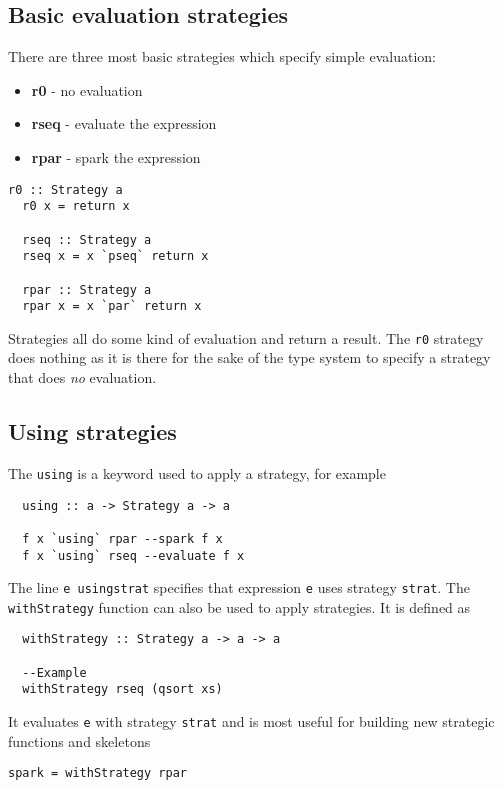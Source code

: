 \documentclass[CS4204-Notes.tex]{subfiles}
\begin{document}
\subsection{Basic evaluation strategies}
There are three most basic strategies which specify simple evaluation:
\begin{itemize}
\item \textbf{r0} - no evaluation
\item \textbf{rseq} - evaluate the expression
\item \textbf{rpar} - spark the expression
\end{itemize}
\begin{lstlisting}[caption={Definitions of basic strategies}]
  r0 :: Strategy a
  r0 x = return x

  rseq :: Strategy a
  rseq x = x `pseq` return x

  rpar :: Strategy a
  rpar x = x `par` return x
\end{lstlisting}
Strategies all do some kind of evaluation and return a result. The \texttt{r0} strategy does nothing as it is there for the sake of the type system to specify a strategy that does \textit{no} evaluation.

\subsection{Using strategies}
The \texttt{\textquoteback using\textquoteback} is a keyword used to apply a strategy, for example
\begin{lstlisting}
  using :: a -> Strategy a -> a

  f x `using` rpar --spark f x
  f x `using` rseq --evaluate f x
\end{lstlisting}
The line \texttt{e \textquoteback using\textquoteback strat} specifies that expression \texttt{e} uses strategy \texttt{strat}.
\n
The \texttt{withStrategy} function can also be used to apply strategies. It is defined as
\begin{lstlisting}
  withStrategy :: Strategy a -> a -> a

  --Example
  withStrategy rseq (qsort xs)
\end{lstlisting}
It evaluates \texttt{e} with strategy \texttt{strat} and is most useful for building new strategic functions and skeletons
\begin{lstlisting}
spark = withStrategy rpar
\end{lstlisting}
\end{document}
